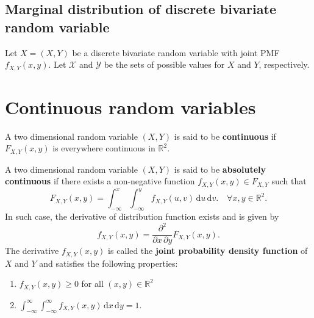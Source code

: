 \subsection{Marginal distribution of discrete bivariate random variable}

Let $X = (X, Y)$ be a discrete bivariate random variable with joint PMF $f_{X, Y}(x, y)$. 
Let $\mathcal{X}$ and $\mathcal{Y}$ be the sets of possible values for $X$ and $Y$, respectively.

\section{Continuous random variables}
A two dimensional random variable $(X, Y)$ is said to be 
\textbf{continuous} if $F_{X,Y}(x,y)$ is everywhere continuous in $\mathbb{R}^2$.

\begin{definition}
    A two dimensional random variable $(X, Y)$ is said to be \textbf{absolutely continuous} 
    if there exists a non-negative function $f_{X,Y}(x,y) \in F_{X,Y}$ such that
    \begin{equation}
        F_{X,Y}(x, y) = \int_{-\infty}^{x} \int_{-\infty}^{y} f_{X,Y}(u, v) \, \mathrm{d}u \, \mathrm{d}v. \quad 
        \forall x, y \in \mathbb{R}^2.
    \end{equation}
    In such case, the derivative of distribution function exists and is given by
    \begin{equation}
        f_{X,Y}(x,y) = \frac{\partial^2}{\partial x \, \partial y} F_{X,Y}(x,y).
    \end{equation}
    The derivative $f_{X,Y}(x,y)$ is called the \textbf{joint probability density function} of $X$ and $Y$ 
    and satisfies the following properties:
    \begin{enumerate}
        \item $f_{X,Y}(x,y) \geq 0$ for all $(x,y) \in \mathbb{R}^2$
        \item $\int_{-\infty}^{\infty} \int_{-\infty}^{\infty} f_{X,Y}(x,y) \, \mathrm{d}x \, \mathrm{d}y = 1$.
    \end{enumerate}
\end{definition}

